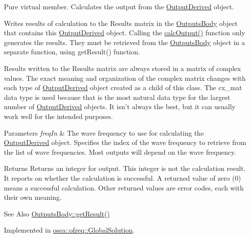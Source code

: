 Pure virtual member. Calculates the output from the \hyperlink{classosea_1_1ofreq_1_1_output_derived}{Output\-Derived} object. 

Writes results of calculation to the Results matrix in the \hyperlink{classosea_1_1ofreq_1_1_outputs_body}{Outputs\-Body} object that contains this \hyperlink{classosea_1_1ofreq_1_1_output_derived}{Output\-Derived} object. Calling the \hyperlink{classosea_1_1ofreq_1_1_output_derived_a0958c43739fc778d0141e806dafbf46c}{calc\-Output()} function only generates the results. They must be retrieved from the \hyperlink{classosea_1_1ofreq_1_1_outputs_body}{Outputs\-Body} object in a separate function, using get\-Result() function.

Results written to the Results matrix are always stored in a matrix of complex values. The exact meaning and organization of the complex matrix changes with each type of \hyperlink{classosea_1_1ofreq_1_1_output_derived}{Output\-Derived} object created as a child of this class. The cx\-\_\-mat data type is used because that is the most natural data type for the largest number of \hyperlink{classosea_1_1ofreq_1_1_output_derived}{Output\-Derived} objects. It isn't always the best, but it can usually work well for the intended purposes. 
\begin{DoxyParams}{Parameters}
{\em freq\-In} & The wave frequency to use for calculating the \hyperlink{classosea_1_1ofreq_1_1_output_derived}{Output\-Derived} object. Specifies the index of the wave frequency to retrieve from the list of wave frequencies. Most outputs will depend on the wave frequency. \\
\hline
\end{DoxyParams}
\begin{DoxyReturn}{Returns}
Returns an integer for output. This integer is not the calculation result. It reports on whether the calculation is successful. A returned value of zero (0) means a successful calculation. Other returned values are error codes, each with their own meaning. 
\end{DoxyReturn}
\begin{DoxySeeAlso}{See Also}
\hyperlink{classosea_1_1ofreq_1_1_outputs_body_a9f4ce07727d5e3170ae9280b1a9ec475}{Outputs\-Body\-::get\-Result()} 
\end{DoxySeeAlso}


Implemented in \hyperlink{classosea_1_1ofreq_1_1_global_solution_ac9e36cb3ec2beb4a308466fab0263714}{osea\-::ofreq\-::\-Global\-Solution}.

